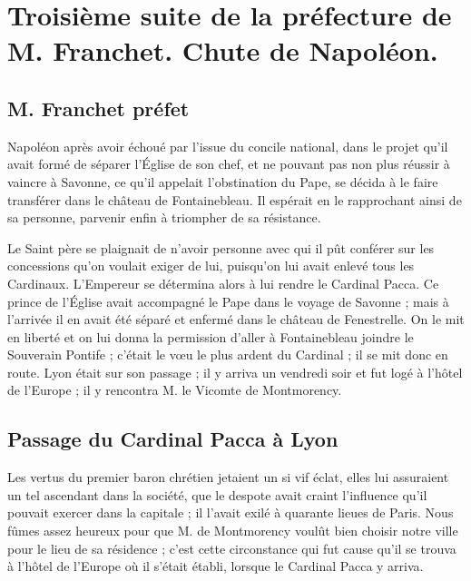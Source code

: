 \chapter{Troisième suite de la préfecture de M. Franchet. Chute de Napoléon.}

\section*{M. Franchet préfet}
Napoléon après avoir échoué par l'issue du concile national, dans le projet qu'il avait formé de séparer l'Église de son chef, et ne pouvant pas non plus réussir à vaincre à Savonne, ce qu'il appelait l'obstination du Pape, se décida à le faire transférer dans le château de Fontainebleau. Il espérait en le rapprochant ainsi de sa personne, parvenir enfin à triompher de sa résistance.

Le Saint père se plaignait de n'avoir personne avec qui il pût conférer sur les concessions qu'on voulait exiger de lui, puisqu'on lui avait enlevé tous les Cardinaux. L'Empereur se détermina alors à lui rendre le Cardinal Pacca. Ce prince de l'Église avait accompagné le Pape dans le voyage de Savonne ; mais à l'arrivée il en avait été séparé et enfermé dans le château de Fenestrelle.
On le mit en liberté et on lui donna la permission d'aller à Fontainebleau joindre le Souverain Pontife ; c'était le vœu le plus ardent du Cardinal ; il se mit donc en route. Lyon était sur son passage ; il y arriva un vendredi soir et fut logé à l'hôtel de l'Europe ; il y rencontra M. le Vicomte de Montmorency.

\section*{Passage du Cardinal Pacca à Lyon}
Les vertus du premier baron chrétien jetaient un si vif éclat, elles lui assuraient un tel ascendant dans la société, que le despote avait craint l'influence qu'il pouvait exercer dans la capitale ; il l'avait exilé à quarante lieues de Paris. Nous fûmes assez heureux pour que M. de Montmorency voulût bien choisir notre ville pour le lieu de sa résidence ; c'est cette circonstance qui fut cause qu'il se trouva à l'hôtel de l'Europe où il s'était établi, lorsque le Cardinal Pacca y arriva.

